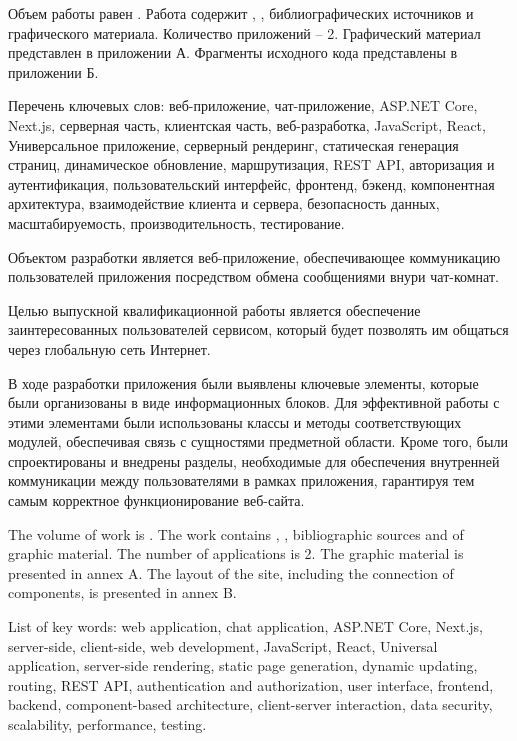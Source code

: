 
Объем работы равен . Работа содержит , ,  библиографических источников и  графического материала. Количество приложений – 2. Графический материал представлен в приложении А. Фрагменты исходного кода представлены в приложении Б.

Перечень ключевых слов: веб-приложение, чат-приложение, ASP.NET Core, Next.js, серверная часть, клиентская часть, веб-разработка, JavaScript, React, Универсальное приложение, серверный рендеринг, статическая генерация страниц, динамическое обновление, маршрутизация, REST API, авторизация и аутентификация, пользовательский интерфейс, фронтенд, бэкенд, компонентная архитектура, взаимодействие клиента и сервера, безопасность данных, масштабируемость, производительность, тестирование.

Объектом разработки является веб-приложение, обеспечивающее коммуникацию пользователей приложения посредством обмена сообщениями внури чат-комнат.

Целью выпускной квалификационной работы является обеспечение заинтересованных пользователей сервисом, который будет позволять им общаться через глобальную сеть Интернет.

В ходе разработки приложения были выявлены ключевые элементы, которые были организованы в виде информационных блоков. Для эффективной работы с этими элементами были использованы классы и методы соответствующих модулей, обеспечивая связь с сущностями предметной области. Кроме того, были спроектированы и внедрены разделы, необходимые для обеспечения внутренней коммуникации между пользователями в рамках приложения, гарантируя тем самым корректное функционирование веб-сайта.


  
The volume of work is . The work contains , ,  bibliographic sources and  of graphic material. The number of applications is 2. The graphic material is presented in annex A. The layout of the site, including the connection of components, is presented in annex B.

List of key words: web application, chat application, ASP.NET Core, Next.js, server-side, client-side, web development, JavaScript, React, Universal application, server-side rendering, static page generation, dynamic updating, routing, REST API, authentication and authorization, user interface, frontend, backend, component-based architecture, client-server interaction, data security, scalability, performance, testing.

